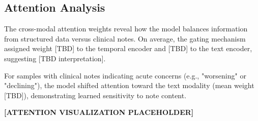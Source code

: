 \subsection{Attention Analysis}

The cross-modal attention weights reveal how the model balances information from structured data versus clinical notes. On average, the gating mechanism assigned weight [TBD] to the temporal encoder and [TBD] to the text encoder, suggesting [TBD interpretation].

For samples with clinical notes indicating acute concerns (e.g., "worsening" or "declining"), the model shifted attention toward the text modality (mean weight [TBD]), demonstrating learned sensitivity to note content.

\textbf{[ATTENTION VISUALIZATION PLACEHOLDER]}
